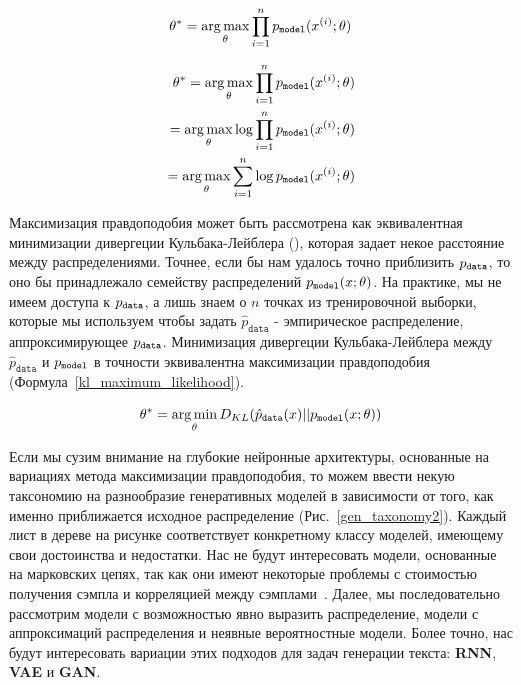 \documentclass{spbau-diploma}
\begin{document}
\begin{equation}
\label{maximum_likelihood}
\theta^* = \operatorname*{arg\,max}_{\theta} \prod^{n}_{i=1}{p_{\texttt{model}}(x^{(i)}; \theta)}
\end{equation}

\begin{equation}
\label{log_maximum_likelihood}
\begin{split}
\theta^* = \operatorname*{arg\,max}_{\theta} \prod^{n}_{i=1}{p_{\texttt{model}}(x^{(i)}; \theta)} \\
= \operatorname*{arg\,max}_{\theta} \log \prod^{n}_{i=1}{p_{\texttt{model}}(x^{(i)}; \theta)} \\
= \operatorname*{arg\,max}_{\theta} \sum\limits^{n}_{i=1}{\log p_{\texttt{model}}(x^{(i)}; \theta)}
\end{split}
\end{equation}

Максимизация правдоподобия может быть рассмотрена как эквивалентная минимизации
дивергеции Кульбака-Лейблера (\cite{wiki:kldiv}), которая задает некое 
расстояние между распределениями. Точнее, если бы нам удалось точно приблизить 
$p_{\texttt{data}}$, то оно бы принадлежало семейству распределений $p_{\texttt{model}}(x; \theta)$. 
На практике, мы не имеем доступа к $p_{\texttt{data}}$, а лишь знаем о $n$ точках из 
тренировочной выборки, которые мы используем чтобы задать $\hat 
p_{\texttt{data}}$ - эмпирическое распределение, аппроксимирующее $p_{\texttt{data}}$. 
Минимизация дивергеции Кульбака-Лейблера между $\hat p_{\texttt{data}}$ и 
$p_{\texttt{model}}$ в точности эквивалентна максимизации правдоподобия
(Формула~\ref{kl_maximum_likelihood}).

\begin{equation}
\label{kl_maximum_likelihood}
\theta^* = \operatorname*{arg\,min}_{\theta} D_{KL}(\hat p_{\texttt{data}}(x) || p_{\texttt{model}}(x; \theta))
\end{equation}

Если мы сузим внимание на глубокие нейронные архитектуры, основанные на 
вариациях метода максимизации правдоподобия, то можем ввести некую таксономию 
на разнообразие генеративных моделей в зависимости от того, как именно 
приближается исходное распределение (Рис.~\ref{gen_taxonomy2}). Каждый лист в
дереве на рисунке соответствует конкретному классу моделей, имеющему свои 
достоинства и недостатки. Нас не будут интересовать модели, основанные на 
марковских цепях, так как они имеют некоторые проблемы с стоимостью получения
сэмпла и корреляцией между сэмплами~\cite{vetrovgan}. Далее, мы 
последовательно рассмотрим модели с возможностью явно выразить распределение,
модели с аппроксимаций распределения и неявные вероятностные модели. Более 
точно, нас будут интересовать вариации этих подходов для задач генерации текста:
\textbf{RNN}, \textbf{VAE} и \textbf{GAN}.
\end{document}
